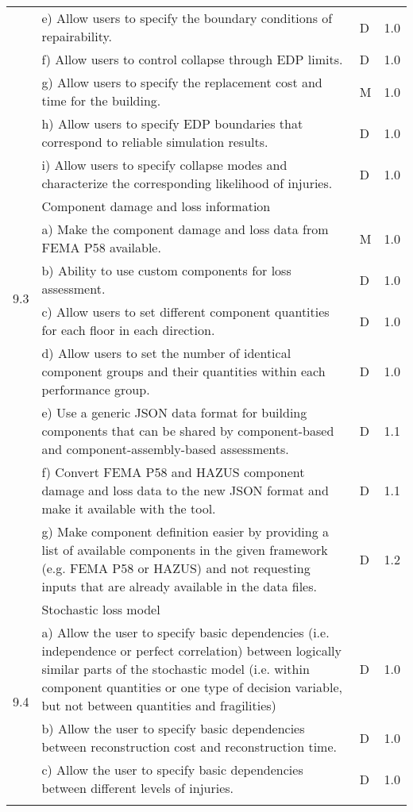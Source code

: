 {\begin{longtable}{| p{} | p{} | p{} | p{} |}
{     & e) Allow users to specify the boundary conditions of repairability. & D & 1.0 \\
     & f) Allow users to control collapse through EDP limits. & D & 1.0\\
     & g) Allow users to specify the replacement cost and time for the building. & M & 1.0 \\
     & h) Allow users to specify EDP boundaries that correspond to reliable simulation results. & D & 1.0\\
     & i) Allow users to specify collapse modes and characterize the corresponding likelihood of injuries. & D & 1.0\\ \hline
	\multirow{5}{*}{9.3} & Component damage and loss information & & \\
	 & a) Make the component damage and loss data from FEMA P58 available. & M & 1.0 \\
	 & b) Ability to use custom components for loss assessment. & D & 1.0 \\
	 & c) Allow users to set different component quantities for each floor in each direction. & D & 1.0 \\
	 & d) Allow users to set the number of identical component groups and their quantities within each performance group. & D & 1.0 \\
     & e) Use a generic JSON data format for building components that can be shared by component-based and component-assembly-based assessments. & D & 1.1 \\
	 & f) Convert FEMA P58 and HAZUS component damage and loss data to the new JSON format and make it available with the tool. & D & 1.1 \\
	 & g) Make component definition easier by providing a list of available components in the given framework (e.g. FEMA P58 or HAZUS) and not requesting inputs that are already available in the data files. & D & 1.2 \\ \hline
	 \multirow{5}{*}{9.4} & Stochastic loss model & & \\
	 & a) Allow the user to specify basic dependencies (i.e. independence or perfect correlation) between logically similar parts of the stochastic model (i.e. within component quantities or one type of decision variable, but not between quantities and fragilities) & D & 1.0 \\
	 & b) Allow the user to specify basic dependencies between reconstruction cost and reconstruction time. & D & 1.0 \\
	 & c) Allow the user to specify basic dependencies between different levels of injuries. & D & 1.0 \\
}
\end{longtable}}

